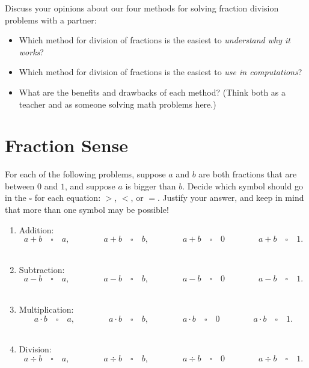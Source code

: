 \begin{thinkpair*}
Discuss your opinions about our four methods for solving fraction division problems with a partner:

\begin{itemize}
\item
Which method for division of fractions is the easiest to \emph{understand why it works}? 
\item
Which method for division of fractions is the easiest to \emph{use in computations}? 
\item
What are the benefits and drawbacks of each method?  (Think both as a teacher and as someone solving math problems here.) 
\end{itemize}
\end{thinkpair*}




\section{Fraction Sense}

\begin{thinkpair*}
For each of the following problems, suppose $a$ and $b$ are both fractions that are between $0$ and $1$, and suppose $a$ is bigger than $b$.  Decide which symbol should go in the $\square$ for each equation: $>$, $<$,  or $=$.  Justify your answer, and keep in mind that more than one symbol may be possible!

\begin{enumerate}
\item
Addition:
\[
a + b \quad  \square \quad a,
\qquad\qquad
a + b \quad  \square \quad b,
\qquad\qquad
a + b \quad  \square \quad 0
\qquad\qquad
a + b \quad  \square \quad 1.
\]\\

\item
Subtraction:
\[
a - b \quad  \square \quad a,
\qquad\qquad
a - b \quad  \square \quad b,
\qquad\qquad
a - b \quad  \square \quad 0
\qquad\qquad
a - b \quad  \square \quad 1.
\]\\


\item
Multiplication:
\[
a\cdot b \quad  \square \quad a,
\qquad\qquad
a \cdot b \quad  \square \quad b,
\qquad\qquad
a \cdot b \quad  \square \quad 0
\qquad\qquad
a \cdot b \quad  \square \quad 1.
\]\\



\item
Division:
\[
a\div b \quad  \square \quad a,
\qquad\qquad
a \div b \quad  \square \quad b,
\qquad\qquad
a \div b \quad  \square \quad 0
\qquad\qquad
a \div b \quad  \square \quad 1.
\]\\


\end{enumerate}
\end{thinkpair*}


